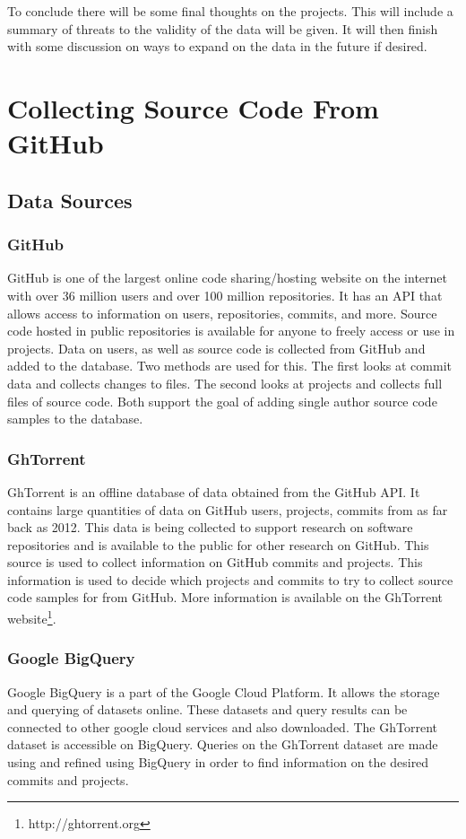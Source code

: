 \documentclass[12pt]{article}
\begin{document}
To conclude there will be some final thoughts on the projects. This will include a summary of threats to the validity of the data will be given. It will then finish with some discussion on ways to expand on the data in the future if desired.


\section{Collecting Source Code From GitHub}


\subsection{Data Sources}
\subsubsection*{GitHub}
GitHub is one of the largest online code sharing/hosting website on the internet with over 36 million users and over 100 million repositories\cite{WEBSITE:Git1}. It has an API that allows access to information on users, repositories, commits, and more. Source code hosted in public repositories is available for anyone to freely access or use in projects. Data on users, as well as source code is collected from GitHub and added to the database. Two methods are used for this. The first looks at commit data and collects changes to files. The second looks at projects and collects full files of source code. Both support the goal of adding single author source code samples to the database.

\subsubsection*{GhTorrent}
GhTorrent is an offline database of data obtained from the GitHub API\cite{Gousi13}. It contains large quantities of data on GitHub users, projects, commits from as far back as 2012. This data is being collected to support research on software repositories and is available to the public for other research on GitHub. This source is used to collect information on GitHub commits and projects. This information is used to decide which projects and commits to try to collect source code samples for from GitHub. More information is available on the GhTorrent website\footnote{http://ghtorrent.org}.

\subsubsection*{Google BigQuery}
Google BigQuery is a part of the Google Cloud Platform. It allows the storage and querying of datasets online. These datasets and query results can be connected to other google cloud services and also downloaded. The GhTorrent dataset is accessible on BigQuery. Queries on the GhTorrent dataset are made  using and refined using BigQuery in order to find information on the desired commits and projects.
\end{document}

